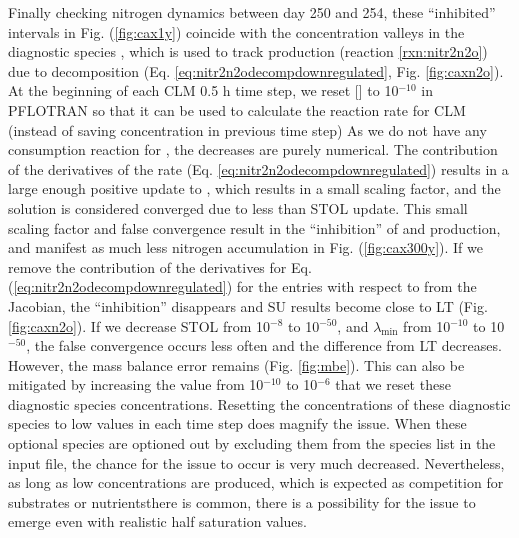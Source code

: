 \documentclass[gmd, manuscript]{copernicus}
\begin{document}
Finally checking nitrogen dynamics between day 250 and 254, these ``inhibited''
intervals in Fig. (\ref{fig:cax1y}) coincide with the concentration valleys
in the diagnostic species , which is used to track 
production (reaction \ref{rxn:nitr2n2o}) due to decomposition (Eq.
\ref{eq:nitr2n2odecompdownregulated}, Fig. \ref{fig:caxn2o}). At the
beginning of each CLM 0.5 h time step, we reset [] to
10$^{-10}$ in PFLOTRAN so that it can be used to calculate the reaction rate
for CLM (instead of saving concentration in previous time step)
As we do not have any
consumption reaction for , the decreases are purely numerical. The
contribution of the derivatives of the rate (Eq.
\ref{eq:nitr2n2odecompdownregulated}) results in a large enough positive update
to , which results in a small scaling factor, and the solution is
considered converged due to less than STOL update. This small scaling factor
and false convergence result in the ``inhibition'' of  and
 production, and manifest as much less nitrogen accumulation in
Fig. (\ref{fig:cax300y}). If we remove the contribution of the derivatives
for Eq. (\ref{eq:nitr2n2odecompdownregulated}) for the entries with respect to
 from the Jacobian,  the ``inhibition'' disappears and SU results
become close to LT (Fig. \ref{fig:caxn2o}). If we decrease STOL from
10$^{-8}$ to 10$^{-50}$, and $\lambda_\text{min}$ from 10$^{-10}$ to
10$^{-50}$, the false convergence occurs less often and the difference from LT
decreases. However, the mass balance error remains (Fig. \ref{fig:mbe}). This
can also be mitigated by increasing the value from 10$^{-10}$
to 10$^{-6}$ that we reset these diagnostic species concentrations.
Resetting the concentrations of these diagnostic species to low values in each
time step does magnify the issue. When these optional species are optioned out
by excluding them from the species list in the input file, the chance for the
issue to occur is very much decreased. Nevertheless, as long as low concentrations
are produced, which is expected as competition for substrates or nutrientsthere
is common, there is a possibility for the issue to emerge even with
realistic half saturation values.  
\end{document}
